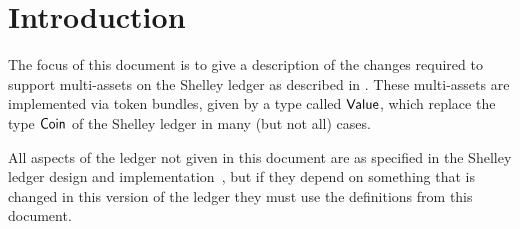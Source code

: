 \section{Introduction}

The focus of this document is to give a description of the changes
required to support multi-assets on the Shelley ledger as described in
\cite{utxo_ma}. These multi-assets are implemented via token bundles,
given by a type called $\mathsf{Value}$, which replace the type $\mathsf{Coin}$ of the
Shelley ledger in many (but not all) cases.

All aspects of the ledger not given in this document are as specified
in the Shelley ledger design and implementation~\cite{shelley_spec},
but if they depend on something that is changed in this version of the
ledger they must use the definitions from this document.
